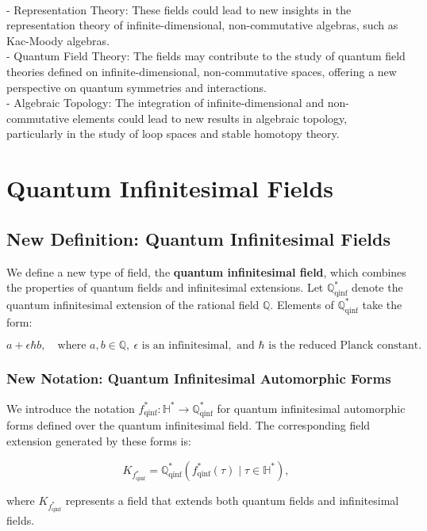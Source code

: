 \documentclass{article}
\begin{document}
{\ }\\
- Representation Theory: These fields could lead to new insights in the representation theory of infinite-dimensional, non-commutative algebras, such as Kac-Moody algebras.
{\ }\\
- Quantum Field Theory: The fields may contribute to the study of quantum field theories defined on infinite-dimensional, non-commutative spaces, offering a new perspective on quantum symmetries and interactions.
{\ }\\
- Algebraic Topology: The integration of infinite-dimensional and non-commutative elements could lead to new results in algebraic topology, particularly in the study of loop spaces and stable homotopy theory.


\section{Quantum Infinitesimal Fields}
\subsection{New Definition: Quantum Infinitesimal Fields}
We define a new type of field, the \textbf{quantum infinitesimal field}, which combines the properties of quantum fields and infinitesimal extensions. Let \(\mathbb{Q}_{\text{qinf}}^*\) denote the quantum infinitesimal extension of the rational field \(\mathbb{Q}\). Elements of \(\mathbb{Q}_{\text{qinf}}^*\) take the form:

\[
a + \epsilon \hbar b, \quad \text{where } a, b \in \mathbb{Q}, \ \epsilon \text{ is an infinitesimal}, \text{ and } \hbar \text{ is the reduced Planck constant}.
\]

\subsubsection{New Notation: Quantum Infinitesimal Automorphic Forms}
We introduce the notation \(f_{\text{qinf}}^*: \mathbb{H}^* \to \mathbb{Q}_{\text{qinf}}^*\) for quantum infinitesimal automorphic forms defined over the quantum infinitesimal field. The corresponding field extension generated by these forms is:

\[
K_{f_{\text{qinf}}^*} = \mathbb{Q}_{\text{qinf}}^*(f_{\text{qinf}}^*(\tau) \mid \tau \in \mathbb{H}^*),
\]

where \(K_{f_{\text{qinf}}^*}\) represents a field that extends both quantum fields and infinitesimal fields.
\end{document}
